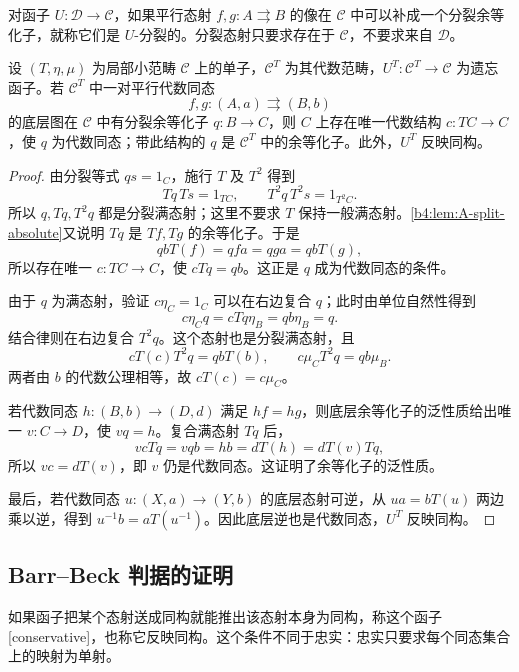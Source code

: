 对函子 \(U:\mathcal D\to\mathcal C\)，如果平行态射 \(f,g:A\rightrightarrows B\) 的像在 \(\mathcal C\) 中可以补成一个分裂余等化子，就称它们是 \(U\)-分裂的。分裂态射只要求存在于 \(\mathcal C\)，不要求来自 \(\mathcal D\)。

\begin{proposition}\label{b4:prop:A-em-split-coequalizers}
	设 \((T,\eta,\mu)\) 为局部小范畴 \(\mathcal C\) 上的单子，\(\mathcal C^T\) 为其代数范畴，\(U^T:\mathcal C^T\to\mathcal C\) 为遗忘函子。若 \(\mathcal C^T\) 中一对平行代数同态
	\[
		f,g:(A,a)\rightrightarrows(B,b)
	\]
	的底层图在 \(\mathcal C\) 中有分裂余等化子 \(q:B\to C\)，则 \(C\) 上存在唯一代数结构 \(c:TC\to C\)，使 \(q\) 为代数同态；带此结构的 \(q\) 是 \(\mathcal C^T\) 中的余等化子。此外，\(U^T\) 反映同构。
\end{proposition}
\begin{proof}
	由分裂等式 \(qs=1_C\)，施行 \(T\) 及 \(T^2\) 得到
	\[
		Tq\,Ts=1_{TC},\qquad T^2q\,T^2s=1_{T^2C}.
	\]
	所以 \(q,Tq,T^2q\) 都是分裂满态射；这里不要求 \(T\) 保持一般满态射。\cref{b4:lem:A-split-absolute}又说明 \(Tq\) 是 \(Tf,Tg\) 的余等化子。于是
	\[
		qbT(f)=qfa=qga=qbT(g),
	\]
	所以存在唯一 \(c:TC\to C\)，使 \(cTq=qb\)。这正是 \(q\) 成为代数同态的条件。

	由于 \(q\) 为满态射，验证 \(c\eta_C=1_C\) 可以在右边复合 \(q\)；此时由单位自然性得到
	\[
		c\eta_Cq=cTq\eta_B=qb\eta_B=q.
	\]
	结合律则在右边复合 \(T^2q\)。这个态射也是分裂满态射，且
	\[
		cT(c)T^2q=qbT(b),\qquad c\mu_CT^2q=qb\mu_B.
	\]
	两者由 \(b\) 的代数公理相等，故 \(cT(c)=c\mu_C\)。

	若代数同态 \(h:(B,b)\to(D,d)\) 满足 \(hf=hg\)，则底层余等化子的泛性质给出唯一 \(v:C\to D\)，使 \(vq=h\)。复合满态射 \(Tq\) 后，
	\[
		vcTq=vqb=hb=dT(h)=dT(v)Tq,
	\]
	所以 \(vc=dT(v)\)，即 \(v\) 仍是代数同态。这证明了余等化子的泛性质。

	最后，若代数同态 \(u:(X,a)\to(Y,b)\) 的底层态射可逆，从 \(ua=bT(u)\) 两边乘以逆，得到 \(u^{-1}b=aT(u^{-1})\)。因此底层逆也是代数同态，\(U^T\) 反映同构。
\end{proof}

\subsection{Barr–Beck 判据的证明}
\label{b4:subsec:A03:02}

如果函子把某个态射送成同构就能推出该态射本身为同构，称这个函子[conservative]，也称它反映同构。这个条件不同于忠实：忠实只要求每个同态集合上的映射为单射。

